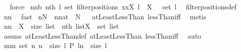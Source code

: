 \begin{isabellebody}
\isadelimproof
\ %
\endisadelimproof
%
\isatagproof
{}\isamarkupfalse%
\ force%
\endisatagproof
{\isafoldproof}%
%
\isadelimproof
%
\endisadelimproof
\isanewline
{}\isamarkupfalse%
\ nn{}{}b{\isacharcolon}\ {\isachardoublequoteopen}{\isacharparenleft}nth\ l{\isacharparenright}{\isacharbackquote}\ set\ {\isacharparenleft}filterpositions{}\ {\isacharparenleft}{\isacharpercent}x{\isachardot}{\isacharparenleft}x{\isasymin}X{\isacharparenright}{\isacharparenright}\ l{\isacharparenright}\ {\isasymsubseteq}\ X\ {\isasyminter}\ \ set\ l{\isachardoublequoteclose}\ \isanewline
%
\isadelimproof
%
\endisadelimproof
%
\isatagproof
{}\isamarkupfalse%
\ filterpositions{}{\isacharunderscore}def\ \isamarkupfalse%
\ nn{}{}\ \isamarkupfalse%
\ fast%
\endisatagproof
{\isafoldproof}%
%
\isadelimproof
\isanewline
%
\endisadelimproof
\isanewline
{}\isamarkupfalse%
\ {\isachardoublequoteopen}{\isacharparenleft}n{\isasymin}{\isacharbraceleft}{}{\isachardot}{\isachardot}{\isacharless}N{\isacharbraceright}{\isacharparenright}\ {\isacharequal}\ {\isacharparenleft}{\isacharparenleft}n{\isacharcolon}{\isacharcolon}nat{\isacharparenright}\ {\isacharless}\ N{\isacharparenright}{\isachardoublequoteclose}%
\isadelimproof
\ %
\endisadelimproof
%
\isatagproof
{}\isamarkupfalse%
\ atLeast{}LessThan\ lessThan{\isacharunderscore}iff\ \isamarkupfalse%
\ metis%
\endisatagproof
{\isafoldproof}%
%
\isadelimproof
%
\endisadelimproof
\isanewline
{}\isamarkupfalse%
\ nn{}{}{\isacharcolon}\ \ {\isachardoublequoteopen}X\ {\isasymsubseteq}\ {\isacharbraceleft}{}{\isachardot}{\isachardot}{\isacharless}size\ list{\isacharbraceright}{\isachardoublequoteclose}\ \ {\isachardoublequoteopen}{\isacharparenleft}nth\ list{\isacharparenright}{\isacharbackquote}X\ {\isasymsubseteq}\ set\ list{\isachardoublequoteclose}\ \isanewline
%
\isadelimproof
%
\endisadelimproof
%
\isatagproof
{}\isamarkupfalse%
\ assms\ atLeastLessThan{\isacharunderscore}def\ atLeast{}LessThan\ lessThan{\isacharunderscore}iff\ \isamarkupfalse%
\ auto%
\endisatagproof
{\isafoldproof}%
%
\isadelimproof
\isanewline
%
\endisadelimproof
{}\isamarkupfalse%
\ mm{}{}{\isacharcolon}\ {\isachardoublequoteopen}set\ {\isacharparenleft}{\isacharbrackleft}n{\isachardot}\ n\ {\isasymleftarrow}\ {\isacharbrackleft}{}{\isachardot}{\isachardot}{\isacharless}size\ l{\isacharbrackright}{\isacharcomma}\ P\ {\isacharparenleft}l{\isacharbang}n{\isacharparenright}{\isacharbrackright}{\isacharparenright}\ {\isasymsubseteq}\ {\isacharbraceleft}{}{\isachardot}{\isachardot}{\isacharless}size\ l{\isacharbraceright}{\isachardoublequoteclose}%

\end{isabellebody}

